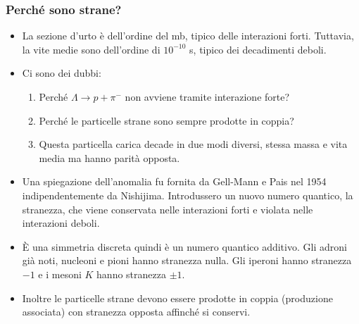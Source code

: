 \subsubsection{Perché sono strane?}
\begin{itemize}
    \item La sezione d'urto è dell'ordine del mb, tipico delle interazioni forti. Tuttavia, la vite medie sono dell'ordine di $10^{-10}$ s, tipico dei decadimenti deboli.
    \item Ci sono dei dubbi:
    \begin{enumerate}
        \item Perché $\Lambda\to p+\pi^-$ non avviene tramite interazione forte?
        \item Perché le particelle strane sono sempre prodotte in coppia?
        \item Questa particella carica decade in due modi diversi, stessa massa e vita media ma hanno parità opposta.
    \end{enumerate}
    \item Una spiegazione dell'anomalia fu fornita da Gell-Mann e Pais nel 1954 indipendentemente da Nishijima. Introdussero un nuovo numero quantico, la stranezza, che viene conservata nelle interazioni forti e violata nelle interazioni deboli.
    \item È una simmetria discreta quindi è un numero quantico additivo. Gli adroni già noti, nucleoni e pioni hanno stranezza nulla. Gli iperoni hanno stranezza $-1$ e i mesoni $K$ hanno stranezza $\pm1$. 
    \item Inoltre le particelle strane devono essere prodotte in coppia (produzione associata) con stranezza opposta affinché si conservi.
\end{itemize}
